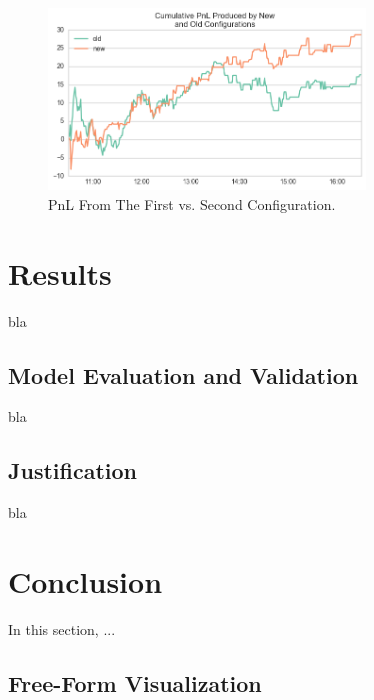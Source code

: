 \documentclass[a4paper]{article}
\begin{document}
\begin{figure}[ht]
\centering
\includegraphics[width=0.75\textwidth]{figures/old_new_comparition.png}
\caption{\label{fig:olicy_test_1}PnL From The First vs. Second Configuration.}
\end{figure}


\section{Results}
\label{sec:results}

bla

\subsection{Model Evaluation and Validation}
bla

\subsection{Justification}
bla


\section{Conclusion}
\label{sec:conclusion}

In this section, ...

\subsection{Free-Form Visualization}
\end{document}
